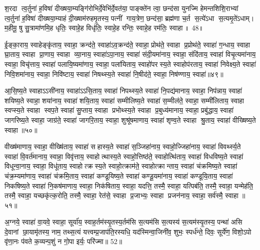 श॒रदा त्व॒र्तुना॑ ह॒विषा॑ दीख्षया॒म्यङ्गि॑रोभिर्दे॒वेभि॑र्दे॒वत॑या॒ पाङ्क्ते॑न त्वा॒ छन्द॑सा युनज्मि हेमन्तशिशि॒राभ्यां त्व॒र्तुना॑ ह॒विषा॑ दीख्षया॒म्याहं दी॒ख्षाम॑रुहमृ॒तस्य॒ पत्नीं गाय॒त्रेण॒ छन्द॑सा॒ ब्रह्म॑णा च॒र्त स॒त्ये॑ऽधा स॒त्यमृ॒ते॑ऽधाम्। म॒हीमू॒ षु सु॒त्रामा॑णमि॒ह धृतिः॒ स्वाहे॒ह विधृ॑तिः॒ स्वाहे॒ह रन्तिः॒ स्वाहे॒ह रम॑तिः॒ स्वाहा॥ 48॥

{\anuvakamend[{}]}

ई॒ङ्का॒राय॒ स्वाहेङ्कृ॑ताय॒ स्वाहा॒ क्रन्द॑ते॒ स्वाहा॑ऽव॒क्रन्द॑ते॒ स्वाहा॒ प्रोथ॑ते॒ स्वाहा प्र॒प्रोथ॑ते॒ स्वाहा॑ ग॒न्धाय॒ स्वाहा घ्रा॒ताय॒ स्वाहा प्रा॒णाय॒ स्वाहा व्या॒नाय॒ स्वाहा॑ऽपा॒नाय॒ स्वाहा॑ संदी॒यमा॑नाय॒ स्वाहा॒ संदि॑ताय॒ स्वाहा॑ विचृ॒त्यमा॑नाय॒ स्वाहा॒ विचृ॑त्ताय॒ स्वाहा॑ पलायि॒ष्यमा॑णाय॒ स्वाहा॒ पला॑यिताय॒ स्वाहो॑परस्य॒ते स्वाहोप॑रताय॒ स्वाहा॑ निवेक्ष्य॒ते स्वाहा॑ निवि॒शमा॑नाय॒ स्वाहा॒ निवि॑ष्टाय॒ स्वाहा॑ निषथ्स्य॒ते स्वाहा॑ नि॒षीद॑ते॒ स्वाहा॒ निष॑ण्णाय॒ स्वाहा॑॥४९॥

आ॒सि॒ष्य॒ते स्वाहाऽऽसी॑नाय॒ स्वाहा॑ऽऽसि॒ताय॒ स्वाहा॑ निपथ्स्य॒ते स्वाहा॑ नि॒पद्य॑मानाय॒ स्वाहा॒ निप॑न्नाय॒ स्वाहा॑ शयिष्य॒ते स्वाहा॒ शया॑नाय॒ स्वाहा॑ शयि॒ताय॒ स्वाहा॑ सम्मीलिष्य॒ते स्वाहा॑ स॒म्मील॑ते॒ स्वाहा॒ सम्मी॑लिताय॒ स्वाहा स्वप्स्य॒ते स्वाहा स्वप॒ते स्वाहा॑ सु॒प्ताय॒ स्वाहा प्रभोथ्स्य॒ते स्वाहा प्र॒बुध्य॑मानाय॒ स्वाहा॒ प्रबु॑द्धाय॒ स्वाहा॑ जागरिष्य॒ते स्वाहा॒ जाग्र॑ते॒ स्वाहा॑ जागरि॒ताय॒ स्वाहा॒ शुश्रू॑षमाणाय॒ स्वाहा॑ शृण्व॒ते स्वाहा श्रु॒ताय॒ स्वाहा॑ वीख्षिष्य॒ते स्वाहा॥५०॥

वीख्ष॑माणाय॒ स्वाहा॒ वीख्षि॑ताय॒ स्वाहा॑ सहास्य॒ते स्वाहा॑ स॒ञ्जिहा॑नाय॒ स्वाहो॒ज्जिहा॑नाय॒ स्वाहा॑ विवर्थ्स्य॒ते स्वाहा॑ वि॒वर्त॑मानाय॒ स्वाहा॒ विवृ॑त्ताय॒ स्वाहोत्थास्य॒ते स्वाहो॒त्तिष्ठ॑ते॒ स्वाहोत्थि॑ताय॒ स्वाहा॑ विधविष्य॒ते स्वाहा॑ विधून्वा॒नाय॒ स्वाहा॒ विधू॑ताय॒ स्वाहोत्क्रस्य॒ते स्वाहो॒त्क्राम॑ते॒ स्वाहोत्क्रान्ताय॒ स्वाहा॑ चंक्रमिष्य॒ते स्वाहा॑ चंक्र॒म्यमा॑णाय॒ स्वाहा॑ चंक्रमि॒ताय॒ स्वाहा॑ कण्डूयिष्य॒ते स्वाहा॑ कण्डू॒यमा॑नाय॒ स्वाहा॑ कण्डूयि॒ताय॒ स्वाहा॑ निकषिष्य॒ते स्वाहा॑ नि॒कष॑माणाय॒ स्वाहा॒ निक॑षिताय॒ स्वाहा॒ यदत्ति॒ तस्मै॒ स्वाहा॒ यत्पिब॑ति॒ तस्मै॒ स्वाहा॒ यन्मेह॑ति॒ तस्मै॒ स्वाहा॒ यच्छकृ॑त्क॒रोति॒ तस्मै॒ स्वाहा॒ रेत॑से॒ स्वाहा प्र॒जाभ्यः॒ स्वाहा प्रजन॑नाय॒ स्वाहा॒ सर्व॑स्मै॒ स्वाहा॥५१॥

{\anuvakamend[{}]}

अ॒ग्नये॒ स्वाहा॑ वा॒यवे॒ स्वाहा॒ सूर्या॑य॒ स्वाह॒र्तम॑स्यृ॒तस्य॒र्तम॑सि स॒त्यम॑सि स॒त्यस्य॑ स॒त्यम॑स्यृ॒तस्य॒ पन्था॑ असि दे॒वानां छा॒यामृ॑तस्य॒ नाम॒ तथ्स॒त्यं यत्त्वम्प्र॒जाप॑ति॒रस्यधि॒ यद॑स्मिन्वा॒जिनी॑व॒ शुभः॒ स्पर्ध॑न्ते॒ दिवः॒ सूर्ये॑ण॒ विशो॒ऽपो वृ॑णा॒नः प॑वते क॒व्यन्प॒शुं न गो॒पा इर्यः॒ परि॑ज्मा॥ 52॥

